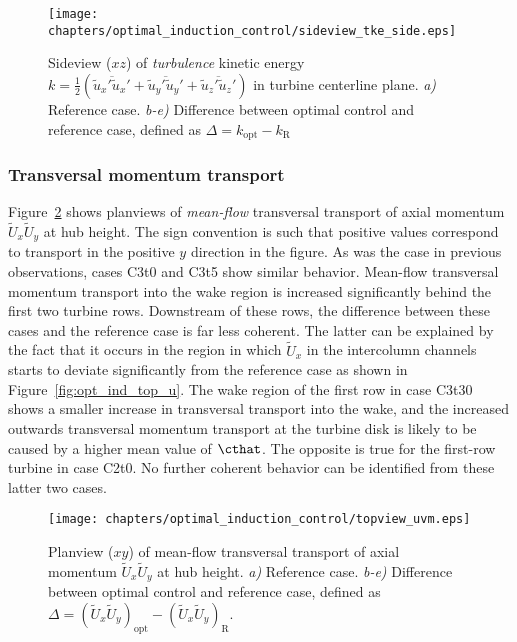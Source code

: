 		\begin{figure}[hbt]
			\centering
			\texttt{[image: chapters/optimal\_induction\_control/sideview\_tke\_side.eps]}
			\caption[Sideview ($xz$) of \emph{turbulence} kinetic energy $k = \frac{1}{2}(\overline{\widetilde{u}_x'\widetilde{u}_x'} + \overline{\widetilde{u}_y'\widetilde{u}_y'} + \overline{\widetilde{u}_z'\widetilde{u}_z'})$ in turbine centerline plane.]{Sideview ($xz$) of \emph{turbulence} kinetic energy $k = \frac{1}{2}(\overline{\widetilde{u}_x'\widetilde{u}_x'} + \overline{\widetilde{u}_y'\widetilde{u}_y'} + \overline{\widetilde{u}_z'\widetilde{u}_z'})$ in turbine centerline plane. \emph{a) } Reference case. \emph{b-e)} Difference between optimal control and reference case, defined as $\Delta = k_{\text{opt}} - k_{\text{R}}$  \label{fig:opt_ind_top_tke}}
		\end{figure}

	\subsubsection{Transversal momentum transport}
	
		Figure~\ref{fig:opt_ind_top_uvm} shows planviews of  \emph{mean-flow} transversal transport of axial momentum $\widetilde{U}_x \widetilde{U}_y$ at hub height. The sign convention is such that positive values correspond to transport in the positive $y$ direction in the figure. As was the case in previous observations, cases C3t0 and C3t5 show similar behavior. Mean-flow transversal momentum transport into the wake region is increased significantly behind the first two turbine rows. Downstream of these rows, the difference between these cases and the reference case is far less coherent. The latter can be explained by the fact that it occurs in the region in which $\widetilde{U}_x$ in the intercolumn channels starts to deviate significantly from the reference case as shown in Figure~\ref{fig:opt_ind_top_u}. The wake region of the first row in case C3t30 shows a smaller increase in transversal transport into the wake, and the increased outwards transversal momentum transport at the turbine disk is likely to be caused by a higher mean value of $\cthat$. The opposite is true for the first-row turbine in case C2t0. No further coherent behavior can be identified from these latter two cases.
	
		\begin{figure}[ht]
			\centering
			\texttt{[image: chapters/optimal\_induction\_control/topview\_uvm.eps]}
			\caption[Planview ($xy$) of mean-flow transversal transport of axial momentum $\widetilde{U}_x \widetilde{U}_y$ at hub height.]{Planview ($xy$) of mean-flow transversal transport of axial momentum $\widetilde{U}_x \widetilde{U}_y$ at hub height. \emph{a) } Reference case. \emph{b-e)} Difference between optimal control and reference case, defined as $\Delta = (\widetilde{U}_x \widetilde{U}_y)_{\text{opt}} - (\widetilde{U}_x \widetilde{U}_y)_{\text{R}}$. \label{fig:opt_ind_top_uvm}}
		\end{figure}
	
